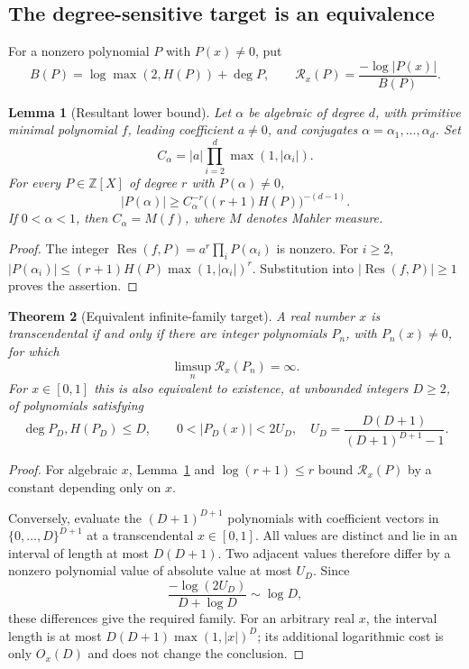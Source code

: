 \documentclass[11pt,a4paper]{article}
\newcommand{\Z}{\mathbb Z}
\newtheorem{theorem}{Theorem}[section]
\newtheorem{lemma}[theorem]{Lemma}
\theoremstyle{definition}
\theoremstyle{remark}
\numberwithin{equation}{section}
\begin{document}
\subsection{The degree-sensitive target is an equivalence}
\label{inf:sub:criterion}
For a nonzero polynomial $P$ with $P(x)\ne0$, put
\[
 B(P)=\log\max(2,H(P))+\deg P,
 \qquad \mathcal R_x(P)=\frac{-\log|P(x)|}{B(P)}.
\]

\begin{lemma}[Resultant lower bound]\label{inf:lem:resultant}
Let $\alpha$ be algebraic of degree $d$, with primitive minimal polynomial $f$, leading coefficient $a\ne0$, and conjugates $\alpha=\alpha_1,\ldots,\alpha_d$. Set
\[
 C_\alpha=|a|\prod_{i=2}^d\max(1,|\alpha_i|).
\]
For every $P\in\Z[X]$ of degree $r$ with $P(\alpha)\ne0$,
\begin{equation}\label{inf:eq:resultant}
 |P(\alpha)|\ge C_\alpha^{-r}\bigl((r+1)H(P)\bigr)^{-(d-1)}.
\end{equation}
If $0<\alpha<1$, then $C_\alpha=M(f)$, where $M$ denotes Mahler measure.
\end{lemma}
\begin{proof}
The integer $\operatorname{Res}(f,P)=a^r\prod_iP(\alpha_i)$ is nonzero. For $i\ge2$,
$|P(\alpha_i)|\le(r+1)H(P)\max(1,|\alpha_i|)^r$. Substitution into $|\operatorname{Res}(f,P)|\ge1$ proves the assertion.
\end{proof}

\begin{theorem}[Equivalent infinite-family target]\label{inf:thm:equivalence}
A real number $x$ is transcendental if and only if there are integer polynomials $P_n$, with $P_n(x)\ne0$, for which
\[
 \limsup_n\mathcal R_x(P_n)=\infty.
\]
For $x\in[0,1]$ this is also equivalent to existence, at unbounded integers $D\ge2$, of polynomials satisfying
\begin{equation}\label{inf:eq:box-target}
 \deg P_D,H(P_D)\le D,\qquad
 0<|P_D(x)|<2U_D,
 \quad U_D=\frac{D(D+1)}{(D+1)^{D+1}-1}.
\end{equation}
\end{theorem}
\begin{proof}
For algebraic $x$, Lemma~\ref{inf:lem:resultant} and $\log(r+1)\le r$ bound $\mathcal R_x(P)$ by a constant depending only on $x$.

Conversely, evaluate the $(D+1)^{D+1}$ polynomials with coefficient vectors in $\{0,\ldots,D\}^{D+1}$ at a transcendental $x\in[0,1]$. All values are distinct and lie in an interval of length at most $D(D+1)$. Two adjacent values therefore differ by a nonzero polynomial value of absolute value at most $U_D$. Since
\[
 \frac{-\log(2U_D)}{D+\log D}\sim\log D,
\]
these differences give the required family. For an arbitrary real $x$, the interval length is at most $D(D+1)\max(1,|x|)^D$; its additional logarithmic cost is only $O_x(D)$ and does not change the conclusion.
\end{proof}
\end{document}
